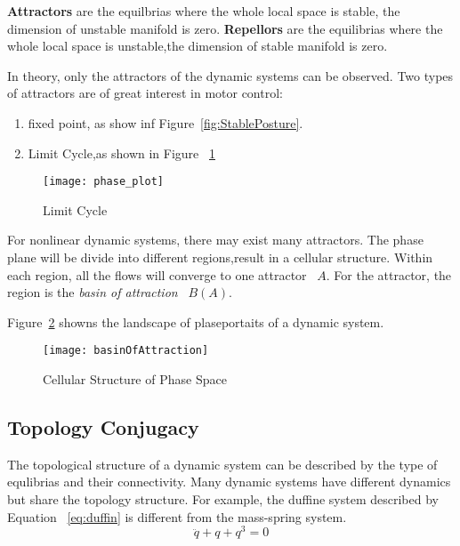 \textbf{Attractors} are the equilbrias where the whole local space is stable, the dimension of unstable manifold is zero.
\textbf{Repellors} are the equilibrias where the whole local space is unstable,the dimension of stable manifold is zero.







In theory, only the attractors of the dynamic systems can be observed.
Two types of attractors are of great interest in motor control:
\begin{enumerate}
 \item fixed point, as show inf Figure~\ref{fig:StablePosture}.
 \item Limit Cycle,as shown in Figure ~\ref{fig:limit_circle}
\end{enumerate}
\begin{figure}
\begin{center}
\label{fig:limit_circle}
\texttt{[image: phase\_plot]}
\caption{Limit Cycle}
\end{center}
\end{figure}





For nonlinear dynamic systems, there may exist many attractors.
The phase plane will be divide into different regions,result in a cellular structure.
Within each region, all the flows will converge to one attractor ~$A$.
For the attractor, the region is  the \emph{basin of attraction} ~$B(A)$.

Figure~\ref{fig:manyboa} showns the landscape of plaseportaits of a dynamic system.
\begin{figure}
\begin{center}
\texttt{[image: basinOfAttraction]}
\end{center}
\caption{Cellular Structure of Phase Space}
\label{fig:manyboa}
\end{figure}




\subsection{Topology Conjugacy}
The topological structure of a dynamic system can be described by the type of equlibrias and their connectivity.
Many dynamic systems have different dynamics but share the topology structure.
For example, the duffine system described by Equation ~\ref{eq:duffin} is different from the mass-spring system.
\begin{equation}
\label{eq:duffin}
\ddot{q}+q+q^{3}=0
\end{equation}

